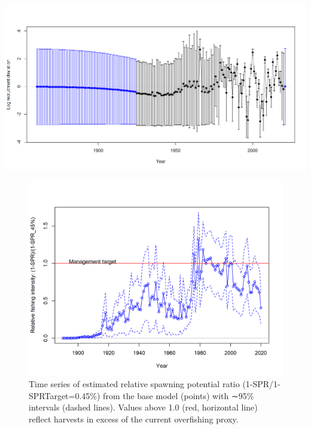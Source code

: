 \documentclass[11pt,
  english,
  a4paper,
]{article}
\begin{document}
\leavevmode\tagmcend\tagstructend\par


\includegraphics[width=1\textwidth,height=1\textheight]{figs/recdevs.png}

\tagmcend\tagstructend


\begin{figure}
\centering
\includegraphics[width=1\textwidth,height=1\textheight]{figs/SPR3_ratiointerval.png}
\caption{Time series of estimated relative spawning potential ratio (1-SPR/1-SPRTarget=0.45\%) from the base model (points) with ∼95\% intervals (dashed lines). Values above 1.0 (red, horizontal line) reflect harvests in excess of the current overfishing proxy.\label{fig:relSPR3}}
\end{figure}
\end{document}
